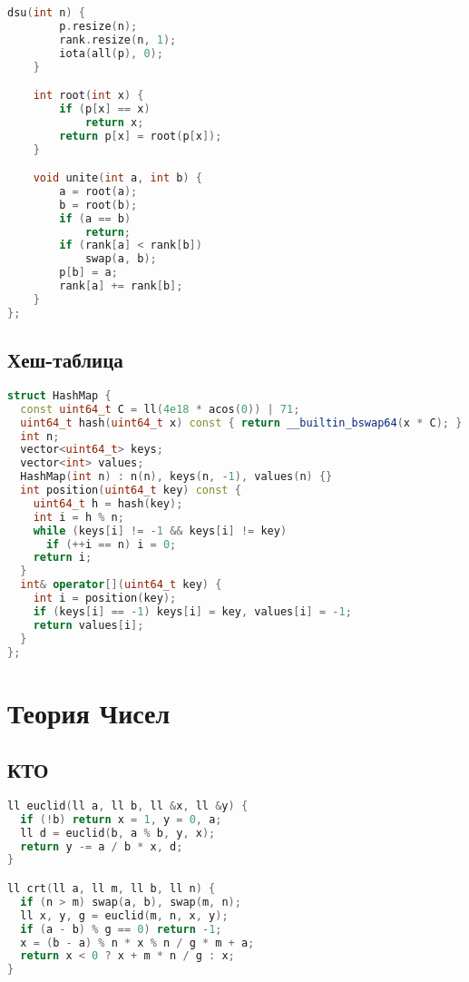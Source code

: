 \documentclass[10pt,a4paper,landscape,twosided]{extarticle}
\begin{document}
\begin{multicols}{3}
\begin{lstlisting}[language=C++]
    dsu(int n) {
        p.resize(n);
        rank.resize(n, 1);
        iota(all(p), 0);
    }

    int root(int x) {
        if (p[x] == x)
            return x;
        return p[x] = root(p[x]);
    }

    void unite(int a, int b) {
        a = root(a);
        b = root(b);
        if (a == b)
            return;
        if (rank[a] < rank[b])
            swap(a, b);
        p[b] = a;
        rank[a] += rank[b];
    }
};
\end{lstlisting}

\subsection{Хеш-таблица}
\begin{lstlisting}[language=C++]
struct HashMap {
  const uint64_t C = ll(4e18 * acos(0)) | 71;
  uint64_t hash(uint64_t x) const { return __builtin_bswap64(x * C); }
  int n;
  vector<uint64_t> keys;
  vector<int> values;
  HashMap(int n) : n(n), keys(n, -1), values(n) {}
  int position(uint64_t key) const {
    uint64_t h = hash(key);
    int i = h % n;
    while (keys[i] != -1 && keys[i] != key)
      if (++i == n) i = 0;
    return i;
  }
  int& operator[](uint64_t key) {
    int i = position(key);
    if (keys[i] == -1) keys[i] = key, values[i] = -1;
    return values[i];
  }
};
\end{lstlisting}

\section{Теория Чисел}

\subsection{КТО}
\begin{lstlisting}[language=C++]
ll euclid(ll a, ll b, ll &x, ll &y) {
  if (!b) return x = 1, y = 0, a;
  ll d = euclid(b, a % b, y, x);
  return y -= a / b * x, d;
}

ll crt(ll a, ll m, ll b, ll n) {
  if (n > m) swap(a, b), swap(m, n);
  ll x, y, g = euclid(m, n, x, y);
  if (a - b) % g == 0) return -1;
  x = (b - a) % n * x % n / g * m + a;
  return x < 0 ? x + m * n / g : x;
}\end{lstlisting}


\end{multicols}
\end{document}

